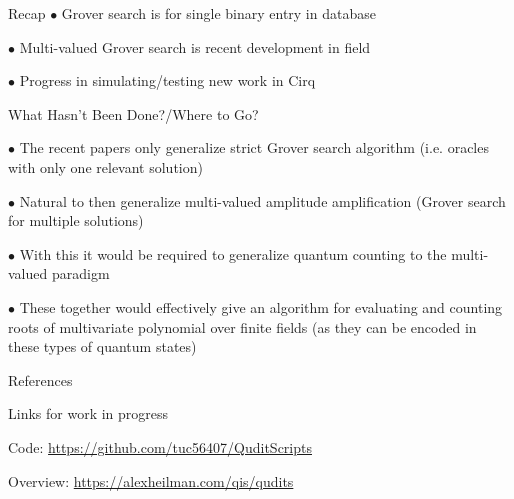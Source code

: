 \documentclass[xcolor=dvipsnames]{beamer}
\begin{document}
\begin{frame}{Recap}
$\bullet$ Grover search is for single binary entry in database 

\vspace{.53cm}\pause

$\bullet$ Multi-valued Grover search is recent development in field

\vspace{.53cm}\pause

$\bullet$ Progress in simulating/testing new work in Cirq


\end{frame}

\begin{frame}{What Hasn't Been Done?/Where to Go?}

$\bullet$ The recent papers only generalize strict Grover search algorithm (i.e. oracles with only one relevant solution)

\medskip\pause

$\bullet$ Natural to then generalize multi-valued amplitude amplification (Grover search for multiple solutions)

\medskip\pause

$\bullet$ With this it would be required to generalize quantum counting to the multi-valued paradigm

\medskip\pause

$\bullet$ These together would effectively give an algorithm for evaluating and counting roots of multivariate polynomial over finite fields (as they can be encoded in these types of quantum states\cite{appel2020})

\end{frame}






\begin{frame}[allowframebreaks]{References}
    \nocite{*}
    \printbibliography

\vspace{.5cm}

Links for work in progress


Code: \url{https://github.com/tuc56407/QuditScripts}


Overview: \url{https://alexheilman.com/qis/qudits}

\end{frame}
\end{document}
